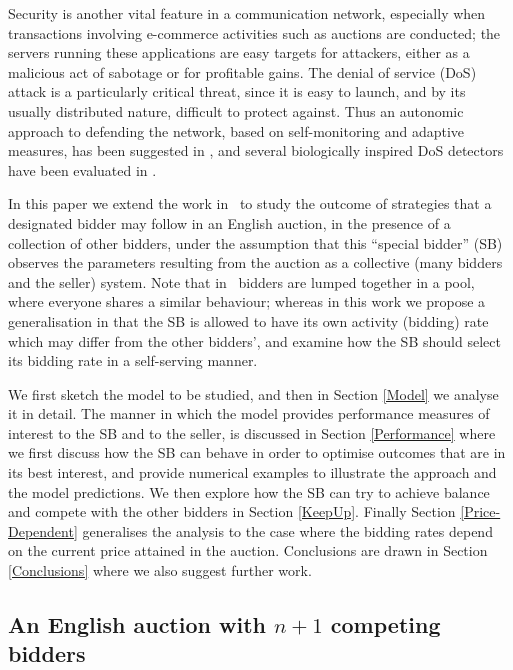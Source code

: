 \documentclass{comjnl}
\begin{document}
Security is another vital feature in a communication network,
especially when transactions involving e-commerce activities such
as auctions are conducted; the servers running these applications
are easy targets for attackers, either as a malicious act of
sabotage or for profitable gains. The denial of service (DoS)
attack is a particularly critical threat, since it is easy to
launch, and by its usually distributed nature, difficult to
protect against. Thus an autonomic approach to defending the
network, based on self-monitoring and adaptive measures, has been
suggested in \cite{Gelenbe_Loukas07_SelfAwareDoS}, and several
biologically inspired DoS detectors have been evaluated in
\cite{Loukas_Oke_07, Loukas_Oke_LikelihoodRatios,Oke_etal07}.


In this paper we extend the work in~\cite{gelenbe06} to study the
outcome of strategies that a designated bidder may follow in an
English auction, in the presence of a collection of other bidders,
under the assumption that this ``special bidder'' (SB) observes
the parameters resulting from the auction as a collective (many
bidders and the seller) system. Note that in~\cite{gelenbe06}
bidders are lumped together in a pool, where everyone shares a
similar behaviour; whereas in this work we propose a
generalisation in that the SB is allowed to have its own activity
(bidding) rate which may differ from the other bidders', and
examine how the SB should select its bidding rate in a
self-serving manner.

We first sketch the model to be studied, and then in Section
\ref{Model} we analyse it in detail. The manner in which the model
provides performance measures of interest to the SB and to the
seller, is discussed in Section \ref{Performance} where we first
discuss how the SB can behave in order to optimise outcomes that
are in its best interest, and provide  numerical examples to
illustrate the approach and the model predictions. We then explore
how the SB can try to achieve balance and compete with the other
bidders in Section \ref{KeepUp}. Finally Section
\ref{Price-Dependent} generalises the analysis to the case where
the bidding rates depend on the current price attained in the
auction. Conclusions are drawn in Section \ref{Conclusions} where
we also suggest further work.



\subsection{An English auction with $n+1$ competing bidders}\label{Sec:FirstModel}
\end{document}
